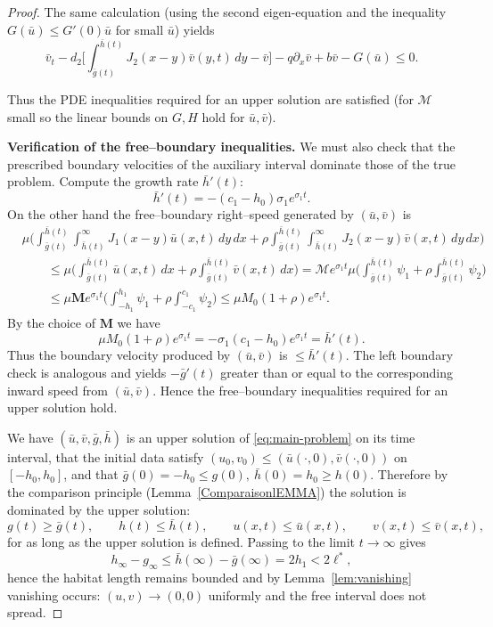\documentclass[a4paper,11pt]{amsart}
\theoremstyle{definition}
\numberwithin{equation}{section}
\theoremstyle{definition}
\begin{document}
\begin{proof}
The same calculation (using the second eigen-equation and the inequality \(G(\bar u)\leq G'(0)\bar u\) for small \(\bar u\)) yields
\[
\bar v_t - d_2\Big[\int_{\bar g(t)}^{\bar h(t)} J_2(x-y)\bar v(y,t)\,dy - \bar v\Big] - q\partial_x\bar v + b\bar v - G(\bar u)
\leq 0.
\]

Thus the PDE inequalities required for an upper solution are satisfied (for \(\mathcal{M}\) small so the linear bounds on \(G,H\) hold for \(\bar u,\bar v\)).

\medskip\noindent\textbf{Verification of the free–boundary inequalities.}
We must also check that the prescribed boundary velocities of the auxiliary interval dominate those of the true problem. Compute the growth rate \(\bar h'(t)\):
\[
\bar h'(t) = -(c_1-h_0)\sigma_1 e^{\sigma_1 t}.
\]
On the other hand the free–boundary right–speed generated by \((\bar u,\bar v)\) is
\[
\begin{aligned}
&\mu \big(\int_{\bar g(t)}^{\bar h(t)}\int_{\bar h(t)}^{\infty} J_1(x-y)\bar u(x,t)\,dy\,dx
+ \rho\int_{\bar g(t)}^{\bar h(t)}\int_{\bar h(t)}^{\infty} J_2(x-y)\bar v(x,t)\,dy\,dx \big) \\
&\qquad \leq \mu\Big(\int_{\bar g(t)}^{\bar h(t)} \bar u(x,t)\,dx + \rho\int_{\bar g(t)}^{\bar h(t)}\bar v(x,t)\,dx\Big)
=  \mathcal{M} e^{\sigma_1 t}\mu\Big(\int_{\bar g(t)}^{\bar h(t)}\psi_1 + \rho\int_{\bar g(t)}^{\bar h(t)}\psi_2\Big) \\
&\qquad \leq  \mu\mathbf{M} e^{\sigma_1 t}\Big( \int_{-h_1}^{h_1}\psi_1 + \rho\int_{-c_1}^{c_1}\psi_2\Big)
\leq  \mu M_0(1+\rho) e^{\sigma_1 t}.
\end{aligned}
\]
By the choice of \(\mathbf{M}\) we have
\[
 \mu M_0(1+\rho) e^{\sigma_1 t} = -\sigma_1(c_1-h_0)e^{\sigma_1 t} = \bar h'(t).
\]
Thus the boundary velocity produced by \((\bar u,\bar v)\) is \(\leq \bar h'(t)\). The left boundary check is analogous and yields \( -\bar g'(t) \) greater than or equal to the corresponding inward speed from \((\bar u,\bar v)\). Hence the free–boundary inequalities required for an upper solution hold.


We have  \((\bar u,\bar v,\bar g,\bar h)\) is an upper solution of \eqref{eq:main-problem} on its time interval, that the initial data satisfy \((u_0,v_0)\leq(\bar u(\cdot,0),\bar v(\cdot,0))\) on \([-h_0,h_0]\), and that \(\bar g(0)=-h_0\leq g(0),\ \bar h(0)=h_0\geq h(0)\). Therefore by the comparison principle (Lemma~\eqref{ComparaisonlEMMA}) the  solution is dominated by the upper solution:
\[
g(t)\geq \bar g(t),\qquad h(t)\leq\bar h(t),\qquad u(x,t)\leq\bar u(x,t),\qquad v(x,t)\leq\bar v(x,t),
\]
for as long as the upper solution is defined. Passing to the limit \(t\to\infty\) gives
\[
h_\infty-g_\infty \leq \bar h(\infty)-\bar g(\infty)=2h_1 < 2\ell^\ast,
\]
hence the habitat length remains bounded and by Lemma~\eqref{lem:vanishing} vanishing occurs: \((u,v)\to(0,0)\) uniformly and the free interval does not spread.
\end{proof}
\end{document}
